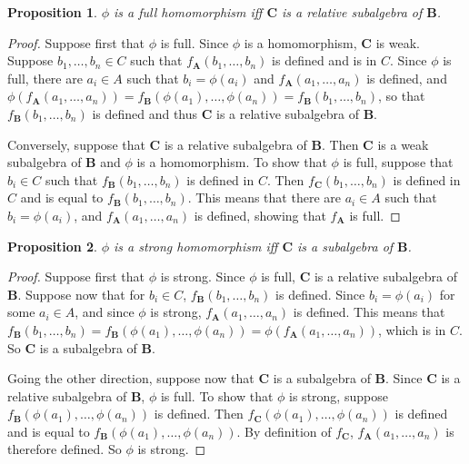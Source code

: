 \documentclass[12pt]{article}
\newtheorem{prop}{Proposition}
\begin{document}
\begin{prop} $\phi$ is a full homomorphism iff $\boldsymbol{C}$ is a relative subalgebra of $\boldsymbol{B}$. \end{prop}
\begin{proof}
Suppose first that $\phi$ is full.  Since $\phi$ is a homomorphism, $\boldsymbol{C}$ is weak.  Suppose $b_1,\ldots, b_n\in C$ such that $f_{\boldsymbol{A}}(b_1,\ldots, b_n)$ is defined and is in $C$.  Since $\phi$ is full, there are $a_i\in A$ such that $b_i = \phi(a_i)$ and $f_{\boldsymbol{A}}(a_1,\ldots, a_n)$ is defined, and $\phi(f_{\boldsymbol{A}}(a_1,\ldots,a_n))=f_{\boldsymbol{B}}(\phi(a_1),\ldots, \phi(a_n))=f_{\boldsymbol{B}}(b_1,\ldots, b_n)$, so that $f_{\boldsymbol{B}}(b_1,\ldots,b_n)$ is defined and thus $\boldsymbol{C}$ is a relative subalgebra of $\boldsymbol{B}$.

Conversely, suppose that $\boldsymbol{C}$ is a relative subalgebra of $\boldsymbol{B}$.  Then $\boldsymbol{C}$ is a weak subalgebra of $\boldsymbol{B}$ and $\phi$ is a homomorphism.  To show that $\phi$ is full, suppose that $b_i\in C$ such that $f_{\boldsymbol{B}}(b_1,\ldots, b_n)$ is defined in $C$.  Then $f_{\boldsymbol{C}}(b_1,\ldots, b_n)$ is defined in $C$ and is equal to $f_{\boldsymbol{B}}(b_1,\ldots, b_n)$.  This means that there are $a_i\in A$ such that $b_i=\phi(a_i)$, and $f_{\boldsymbol{A}}(a_1,\ldots, a_n)$ is defined, showing that $f_{\boldsymbol{A}}$ is full.
\end{proof}

\begin{prop} $\phi$ is a strong homomorphism iff $\boldsymbol{C}$ is a subalgebra of $\boldsymbol{B}$. \end{prop}
\begin{proof}
Suppose first that $\phi$ is strong.  Since $\phi$ is full, $\boldsymbol{C}$ is a relative subalgebra of $\boldsymbol{B}$.  Suppose now that for $b_i\in C$, $f_{\boldsymbol{B}}(b_1,\ldots, b_n)$ is defined.  Since $b_i=\phi(a_i)$ for some $a_i \in A$, and since $\phi$ is strong, $f_{\boldsymbol{A}}(a_1,\ldots, a_n)$ is defined.  This means that $f_{\boldsymbol{B}}(b_1,\ldots, b_n)= f_{\boldsymbol{B}}(\phi(a_1),\ldots, \phi(a_n))=\phi(f_{\boldsymbol{A}}(a_1,\ldots, a_n))$, which is in $C$.  So $\boldsymbol{C}$ is a subalgebra of $\boldsymbol{B}$.

Going the other direction, suppose now that $\boldsymbol{C}$ is a subalgebra of $\boldsymbol{B}$.  Since $\boldsymbol{C}$ is a relative subalgebra of $\boldsymbol{B}$, $\phi$ is full.  To show that $\phi$ is strong, suppose $f_{\boldsymbol{B}}(\phi(a_1),\ldots, \phi(a_n))$ is defined.  Then $f_{\boldsymbol{C}}(\phi(a_1),\ldots, \phi(a_n))$ is defined and is equal to $f_{\boldsymbol{B}}(\phi(a_1),\ldots, \phi(a_n))$. By definition of $f_{\boldsymbol{C}}$, $f_{\boldsymbol{A}}(a_1,\ldots, a_n)$ is therefore defined.  So $\phi$ is strong.
\end{proof}
\end{document}
